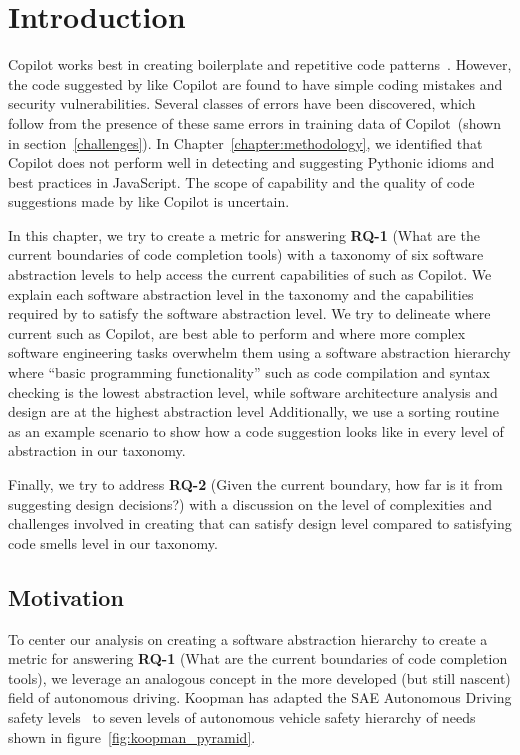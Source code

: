 \label{chapter:framework}

\section{Introduction}
Copilot works best in creating boilerplate and repetitive code patterns~\cite{Copilot-web}.
However, the code suggested by \cct{} like Copilot are found to have simple coding mistakes and security vulnerabilities. Several classes of errors have been discovered, which follow from the presence of these same errors in training data of Copilot~(shown in section~\ref{challenges}).
In Chapter~\ref{chapter:methodology}, we identified that Copilot does not perform well in detecting and suggesting Pythonic idioms and best practices in JavaScript.
The scope of capability and the quality of code suggestions made by \cct{} like Copilot is uncertain. 

In this chapter, we try to create a metric for answering \textbf{RQ-1} (What are the current boundaries of code completion tools) with a taxonomy of six software abstraction levels to help access the current capabilities of \cct{} such as Copilot. 
We explain each software abstraction level in the taxonomy and the capabilities required by \cct{} to satisfy the software abstraction level. 
We try to delineate where current \cct{} such as Copilot, are best able to perform and where more complex software engineering tasks overwhelm them using a software abstraction hierarchy where ``basic programming functionality'' such as code compilation and syntax checking is the lowest abstraction
level, while software architecture analysis and design are at the highest abstraction
level
Additionally, we use a sorting routine as an example scenario to show how a \cct{} code suggestion looks like in every level of abstraction in our taxonomy.

Finally, we try to address \textbf{RQ-2} (Given the current boundary, how far is it from suggesting design decisions?) with a discussion on the level of complexities and challenges involved in creating \cct{} that can satisfy design level compared to \cct{} satisfying code smells level in our taxonomy.

\subsection{Motivation}
To center our analysis on creating a software abstraction hierarchy to create a metric for answering \textbf{RQ-1} (What are the current boundaries of code completion tools), 
we leverage an analogous concept in the more developed (but still nascent) field of autonomous driving. 
Koopman has adapted the SAE Autonomous Driving safety levels~\cite{sae} to seven levels of autonomous vehicle safety hierarchy of needs shown in figure~\ref{fig:koopman_pyramid}. 

